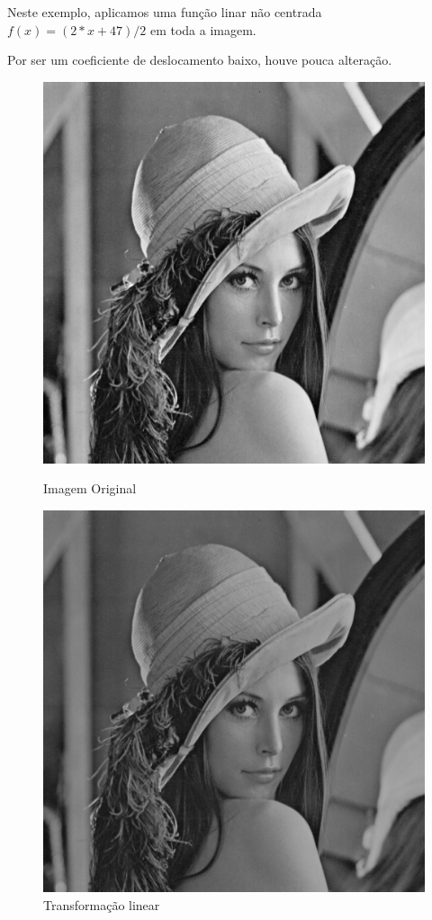 \documentclass{article}
\begin{document}
Neste exemplo, aplicamos uma função linar não centrada $f(x) = (2*x + 47) / 2$ em toda a imagem.

Por ser um coeficiente de deslocamento baixo, houve pouca alteração.


\begin{figure}[!htb]
\begin{minipage}[b]{0.45\linewidth}
\centering
\includegraphics[scale=0.32]{lena_B.png}
\caption{Imagem Original}
\label{fig:original}
\end{minipage}
\hspace{0.5cm}
\begin{minipage}[b]{0.45\linewidth}
\centering
\includegraphics[scale=0.32]{TransLinearSimples.png}
\caption{Transformação linear}
\label{fig:rota}
\end{minipage}
\end{figure}
\end{document}
